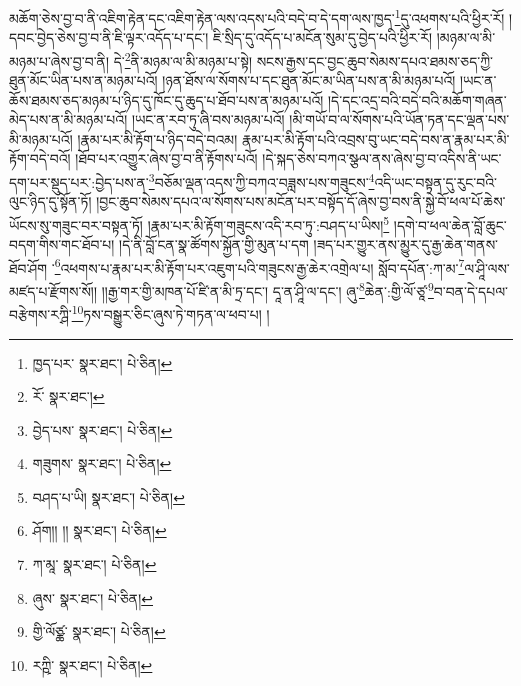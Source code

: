 མཆོག་ཅེས་བྱ་བ་ནི་འཇིག་རྟེན་དང་འཇིག་རྟེན་ལས་འདས་པའི་བདེ་བ་དེ་དག་ལས་ཁྱད་\footnote{ཁྱད་པར་  སྣར་ཐང་།  པེ་ཅིན། }དུ་འཕགས་པའི་ཕྱིར་རོ། །དབང་བྱེད་ཅེས་བྱ་བ་ནི་ཇི་ལྟར་འདོད་པ་དང་། ཇི་སྲིད་དུ་འདོད་པ་མངོན་སུམ་དུ་བྱེད་པའི་ཕྱིར་རོ། །མཉམ་ལ་མི་མཉམ་པ་ཞེས་བྱ་བ་ནི། དེ་\footnote{རོ་  སྣར་ཐང་། }ནི་མཉམ་ལ་མི་མཉམ་པ་སྟེ། སངས་རྒྱས་དང་བྱང་ཆུབ་སེམས་དཔའ་ཐམས་ཅད་ཀྱི་ཐུན་མོང་ཡིན་པས་ན་མཉམ་པའོ། །ཉན་ཐོས་ལ་སོགས་པ་དང་ཐུན་མོང་མ་ཡིན་པས་ན་མི་མཉམ་པའོ། །ཡང་ན་ཆོས་ཐམས་ཅད་མཉམ་པ་ཉིད་དུ་ཁོང་དུ་ཆུད་པ་ཐོབ་པས་ན་མཉམ་པའོ། །དེ་དང་འདྲ་བའི་བདེ་བའི་མཆོག་གཞན་མེད་པས་ན་མི་མཉམ་པའོ། །ཡང་ན་རབ་ཏུ་ཞི་བས་མཉམ་པའོ། །མི་གཡོ་བ་ལ་སོགས་པའི་ཡོན་ཏན་དང་ལྡན་པས་མི་མཉམ་པའོ། །རྣམ་པར་མི་རྟོག་པ་ཉིད་བདེ་བའམ། རྣམ་པར་མི་རྟོག་པའི་འབྲས་བུ་ཡང་བདེ་བས་ན་རྣམ་པར་མི་རྟོག་བདེ་བའོ། །ཐོབ་པར་འགྱུར་ཞེས་བྱ་བ་ནི་རྟོགས་པའོ། །དེ་སྐད་ཅེས་བཀའ་སྩལ་ནས་ཞེས་བྱ་བ་འདིས་ནི་ཡང་དག་པར་སྡུད་པར་:བྱེད་པས་ན་\footnote{བྱེད་པས་  སྣར་ཐང་།  པེ་ཅིན། }བཅོམ་ལྡན་འདས་ཀྱི་བཀའ་བཟླས་པས་གཟུངས་\footnote{གཟུགས་  སྣར་ཐང་།  པེ་ཅིན། }འདི་ཡང་བསྟན་དུ་རུང་བའི་ལུང་ཉིད་དུ་སྟོན་ཏོ། །བྱང་ཆུབ་སེམས་དཔའ་ལ་སོགས་པས་མངོན་པར་བསྟོད་དོ་ཞེས་བྱ་བས་ནི་སྐྱེ་བོ་ཕལ་པོ་ཆེས་ཡོངས་སུ་གཟུང་བར་བསྟན་ཏོ། །རྣམ་པར་མི་རྟོག་གཟུངས་འདི་རབ་ཏུ་:བཤད་པ་ཡིས།\footnote{བཤད་པ་ཡི།  སྣར་ཐང་།  པེ་ཅིན། } །དགེ་བ་ཕལ་ཆེན་བློ་ཆུང་བདག་གིས་གང་ཐོབ་པ། །དེ་ནི་བློ་ངན་སྣ་ཚོགས་སྐྱོན་གྱི་མུན་པ་དག །ཟད་པར་གྱུར་ནས་མྱུར་དུ་རྒྱ་ཆེན་གནས་ཐོབ་ཤོག ་\footnote{ཤོག།། །།  སྣར་ཐང་།  པེ་ཅིན། }འཕགས་པ་རྣམ་པར་མི་རྟོག་པར་འཇུག་པའི་གཟུངས་རྒྱ་ཆེར་འགྲེལ་པ། སློབ་དཔོན་:ཀ་མ་\footnote{ཀ་མཱ་  སྣར་ཐང་།  པེ་ཅིན། }ལ་ཤཱི་ལས་མཛད་པ་རྫོགས་སོ།། །།རྒྱ་གར་གྱི་མཁན་པོ་ཛི་ན་མི་ཏྲ་དང་། དཱ་ན་ཤཱི་ལ་དང་། ཞུ་\footnote{ཞུས་  སྣར་ཐང་།  པེ་ཅིན། }ཆེན་:གྱི་ལོ་ཙཱ་\footnote{གྱི་ལོཙྪ་  སྣར་ཐང་།  པེ་ཅིན། }བ་བན་དེ་དཔལ་བརྩེགས་རཀྴི་\footnote{རཀྵི་  སྣར་ཐང་།  པེ་ཅིན། }ཏས་བསྒྱུར་ཅིང་ཞུས་ཏེ་གཏན་ལ་ཕབ་པ། ། 